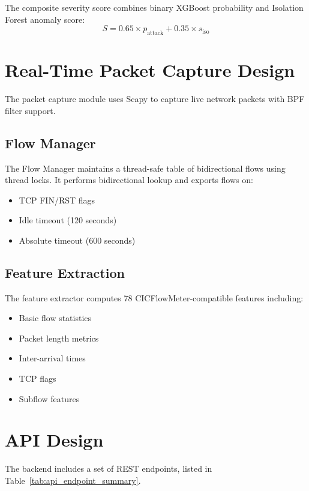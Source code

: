 \documentclass[12pt,a4paper]{report}
\begin{document}
The composite severity score combines binary XGBoost probability and Isolation Forest anomaly score:
\begin{equation}
S = 0.65 \times p_{\text{attack}} + 0.35 \times s_{\text{iso}}
\end{equation}

\section{Real-Time Packet Capture Design}

The packet capture module uses Scapy to capture live network packets with BPF filter support.

\subsection{Flow Manager}

The Flow Manager maintains a thread-safe table of bidirectional flows using thread locks. It performs bidirectional lookup and exports flows on:

\begin{itemize}
    \item TCP FIN/RST flags
    \item Idle timeout (120 seconds)
    \item Absolute timeout (600 seconds)
\end{itemize}

\subsection{Feature Extraction}

The feature extractor computes 78 CICFlowMeter-compatible features including:
\begin{itemize}
    \item Basic flow statistics
    \item Packet length metrics
    \item Inter-arrival times
    \item TCP flags
    \item Subflow features
\end{itemize}

\section{API Design}

The backend includes a set of REST endpoints, listed in Table~\ref{tab:api_endpoint_summary}.
\end{document}

